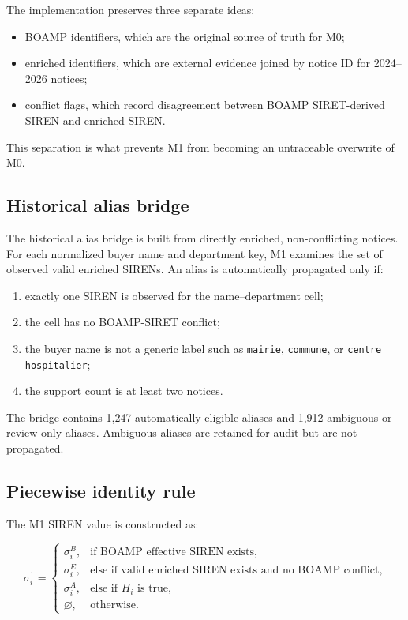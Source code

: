 \documentclass[11pt]{article}
\begin{document}
The implementation preserves three separate ideas:

\begin{itemize}
  \item BOAMP identifiers, which are the original source of truth for M0;
  \item enriched identifiers, which are external evidence joined by
        notice ID for 2024--2026 notices;
  \item conflict flags, which record disagreement between BOAMP SIRET-derived
        SIREN and enriched SIREN.
\end{itemize}

This separation is what prevents M1 from becoming an untraceable overwrite
of M0.

\subsection{Historical alias bridge}

The historical alias bridge is built from directly enriched, non-conflicting
notices. For each normalized buyer name and department key, M1 examines the
set of observed valid enriched SIRENs. An alias is automatically propagated
only if:

\begin{enumerate}
  \item exactly one SIREN is observed for the name--department cell;
  \item the cell has no BOAMP-SIRET conflict;
  \item the buyer name is not a generic label such as \texttt{mairie},
        \texttt{commune}, or \texttt{centre hospitalier};
  \item the support count is at least two notices.
\end{enumerate}

The bridge contains 1,247 automatically eligible aliases and 1,912
ambiguous or review-only aliases. Ambiguous aliases are retained for audit
but are not propagated.

\subsection{Piecewise identity rule}

The M1 SIREN value is constructed as:

\[
\sigma_i^{1} =
\begin{cases}
\sigma_i^{B}, & \text{if BOAMP effective SIREN exists},\\
\sigma_i^{E}, & \text{else if valid enriched SIREN exists and no BOAMP conflict},\\
\sigma_i^{A}, & \text{else if } H_i \text{ is true},\\
\varnothing, & \text{otherwise.}
\end{cases}
\]
\end{document}
